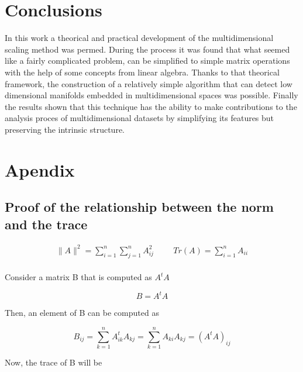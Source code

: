 \documentclass[12pt,journal]{IEEEtran}
\begin{document}
\section{Conclusions}

In this work a theorical and practical development of the multidimensional
scaling method was permed. During the process it was found that what seemed like
a fairly complicated problem, can be simplified to simple matrix operations
with the help of some concepts from linear algebra. Thanks to that theorical
framework, the construction of a relatively simple algorithm that can detect
low dimensional manifolds embedded in multidimensional spaces was possible.
Finally the results shown that this technique has the ability to make
contributions to the analysis proces of multidimensional datasets by
simplifying its features but preserving the intrinsic structure.


\section{Apendix}

    \subsection{Proof of the relationship between the norm and the trace} \label{norm_trace}

    \begin{equation*}
        \begin{aligned}
            \lVert A \rVert^2 = \sum_{i=1}^n \sum_{j=1}^n A_{ij}^2
            \hspace{1cm}
            Tr(A) = \sum_{i=1}^n A_{ii}
        \end{aligned}
    \end{equation*}\\

    Consider a matrix B that is computed as $A^tA$

    \begin{equation*}
        B = A^tA
    \end{equation*}

    Then, an element of B can be computed as

    \begin{equation*}
        B_{ij} = \sum_{k=1}^n A_{ik}^t A_{kj} = \sum_{k=1}^n A_{ki} A_{kj} = (A^tA)_{ij}
    \end{equation*}

    Now, the trace of B will be
\end{document}
